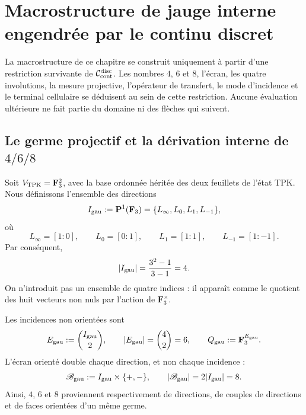 \iffalse
\chapter[Macrostructure de jauge interne]{Macrostructure de jauge interne engendrée par le continu discret}
\label{chap:gauint-macroestructura}

\begin{thesisbox}
La macrostructure de ce chapitre se construit uniquement à partir d'une
restriction survivante de \(\mathcal C_{\rm cont}^{\rm disc}\). Les nombres
\(4\), \(6\) et \(8\), l'écran, les quatre involutions, la mesure
projective, l'opérateur de transfert, le mode d'incidence et le terminal
cellulaire se déduisent au sein de cette restriction. Aucune évaluation ultérieure
ne fait partie du domaine ni des flèches qui suivent.
\end{thesisbox}

\section{Le germe projectif et la dérivation interne de \texorpdfstring{\(4/6/8\)}{4/6/8}}

Soit \(V_{\rm TPK}=\mathbf F_3^2\), avec la base ordonnée héritée des deux
feuillets de l'état TPK. Nous définissons l'ensemble des directions
\begin{equation}\label{eq:gauint-cuatro-direcciones}
 I_{\rm gau}:=\mathbf P^1(\mathbf F_3)
 =\{L_\infty,L_0,L_1,L_{-1}\},
\end{equation}
où
\[
 L_\infty=[1:0],\qquad L_0=[0:1],\qquad
 L_1=[1:1],\qquad L_{-1}=[1:-1].
\]
Par conséquent,
\begin{equation}\label{eq:gauint-cardinal-cuatro}
 |I_{\rm gau}|=\frac{3^2-1}{3-1}=4.
\end{equation}
On n'introduit pas un ensemble de quatre indices : il apparaît comme le quotient des
huit vecteurs non nuls par l'action de \(\mathbf F_3^\times\).

Les incidences non orientées sont
\begin{equation}\label{eq:gauint-seis-incidencias}
 E_{\rm gau}:=\binom{I_{\rm gau}}2,
 \qquad |E_{\rm gau}|=\binom42=6,
 \qquad Q_{\rm gau}:=\mathbf F_3^{E_{\rm gau}}.
\end{equation}
L'écran orienté double chaque direction, et non chaque incidence :
\begin{equation}\label{eq:gauint-ocho-caras}
 \mathscr B_{\rm gau}:=I_{\rm gau}\times\{+,-\},
 \qquad |\mathscr B_{\rm gau}|=2|I_{\rm gau}|=8.
\end{equation}
Ainsi, \(4\), \(6\) et \(8\) proviennent respectivement de directions, de couples de
directions et de faces orientées d'un même germe.

